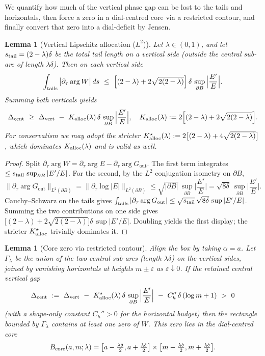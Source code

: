 \documentclass[11pt]{article}
\numberwithin{equation}{section}
\newtheorem{lemma}[theorem]{Lemma}
\theoremstyle{remark}
\newcommand{\Gout}{G_{\mathrm{out}}}
\begin{document}
We quantify how much of the vertical phase gap can be lost to the tails and horizontals, then force a zero in a dial-centred core via a restricted contour, and finally convert that zero into a dial-deficit by Jensen.

\begin{lemma}[Vertical Lipschitz allocation ($L^2$)]\label{lem:allocL2}
Let $\lambda\in(0,1)$, and let $s_{\rm tail}=(2-\lambda)\delta$ be the total tail length on a vertical side (outside the central sub-arc of length $\lambda\delta$). Then on each vertical side
\[
\int_{\textup{tails}} \big|\partial_\tau \arg W\big|\,ds
\ \le\ \Big[(2-\lambda)+2\sqrt{2(2-\lambda)}\Big]\,\delta\,\sup_{\partial B}\Big|\frac{E'}{E}\Big|.
\]
Summing both verticals yields
\[
\Delta_{\rm cent}\ \ge\ \Delta_{\rm vert}\ -\ K_{\rm alloc}(\lambda)\,\delta\,\sup_{\partial B}\Big|\frac{E'}{E}\Big|,
\quad
K_{\rm alloc}(\lambda):=2\Big[(2-\lambda)+2\sqrt{2(2-\lambda)}\Big].
\]
For conservatism we may adopt the stricter $K_{\rm alloc}^{\star}(\lambda):=2\big[(2-\lambda)+4\sqrt{2(2-\lambda)}\big]$, which dominates $K_{\rm alloc}(\lambda)$ and is valid as well.
\end{lemma}

\begin{proof}
Split $\partial_\tau\arg W=\partial_\tau\arg E-\partial_\tau\arg \Gout$. The first term integrates $\le s_{\rm tail}\,\sup_{\partial B}|E'/E|$. For the second, by the $L^2$ conjugation isometry on $\partial B$,
\[
\|\partial_\tau\arg \Gout\|_{L^2(\partial B)}=\|\partial_\tau\log|E|\|_{L^2(\partial B)}\le \sqrt{|\partial B|}\,\sup_{\partial B}\Big|\frac{E'}{E}\Big|=\sqrt{8\delta}\ \sup_{\partial B}\Big|\frac{E'}{E}\Big|.
\]
Cauchy–Schwarz on the tails gives $\int_{\text{tails}}|\partial_\tau\arg \Gout|\le \sqrt{s_{\rm tail}}\,\sqrt{8\delta}\,\sup|E'/E|$. Summing the two contributions on one side gives $\big[(2-\lambda)+2\sqrt{2(2-\lambda)}\big]\delta\,\sup|E'/E|$. Doubling yields the first display; the stricter $K_{\rm alloc}^{\star}$ trivially dominates it.
\end{proof}

\begin{lemma}[Core zero via restricted contour]\label{lem:corezero}
Align the box by taking $\alpha=a$. Let $\Gamma_\lambda$ be the union of the two central sub-arcs (length $\lambda\delta$) on the vertical sides, joined by vanishing horizontals at heights $m\pm\varepsilon$ as $\varepsilon\downarrow 0$. If the retained central vertical gap
\[
\Delta_{\rm cent}\ :=\ \Delta_{\rm vert}\ -\ K_{\rm alloc}^{\star}(\lambda)\,\delta\,\sup_{\partial B}\Big|\frac{E'}{E}\Big| \ -\ C_h''\,\delta\,(\log m+1)
\ >\ 0
\]
(with a shape-only constant $C_h''>0$ for the horizontal budget) then the rectangle bounded by $\Gamma_\lambda$ contains at least one zero of $W$. This zero lies in the dial-centred core
\[
B_{\rm core}(a,m;\lambda)=\big[a-\tfrac{\lambda\delta}{2},a+\tfrac{\lambda\delta}{2}\big]\times \big[m-\tfrac{\lambda\delta}{2},m+\tfrac{\lambda\delta}{2}\big].
\]
\end{lemma}
\end{document}
